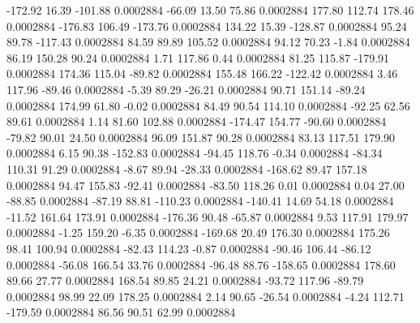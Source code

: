      -172.92       16.39     -101.88     0.0002884
      -66.09       13.50       75.86     0.0002884
      177.80      112.74      178.46     0.0002884
     -176.83      106.49     -173.76     0.0002884
      134.22       15.39     -128.87     0.0002884
       95.24       89.78     -117.43     0.0002884
       84.59       89.89      105.52     0.0002884
       94.12       70.23       -1.84     0.0002884
       86.19      150.28       90.24     0.0002884
        1.71      117.86        0.44     0.0002884
       81.25      115.87     -179.91     0.0002884
      174.36      115.04      -89.82     0.0002884
      155.48      166.22     -122.42     0.0002884
        3.46      117.96      -89.46     0.0002884
       -5.39       89.29      -26.21     0.0002884
       90.71      151.14      -89.24     0.0002884
      174.99       61.80       -0.02     0.0002884
       84.49       90.54      114.10     0.0002884
      -92.25       62.56       89.61     0.0002884
        1.14       81.60      102.88     0.0002884
     -174.47      154.77      -90.60     0.0002884
      -79.82       90.01       24.50     0.0002884
       96.09      151.87       90.28     0.0002884
       83.13      117.51      179.90     0.0002884
        6.15       90.38     -152.83     0.0002884
      -94.45      118.76       -0.34     0.0002884
      -84.34      110.31       91.29     0.0002884
       -8.67       89.94      -28.33     0.0002884
     -168.62       89.47      157.18     0.0002884
       94.47      155.83      -92.41     0.0002884
      -83.50      118.26        0.01     0.0002884
        0.04       27.00      -88.85     0.0002884
      -87.19       88.81     -110.23     0.0002884
     -140.41       14.69       54.18     0.0002884
      -11.52      161.64      173.91     0.0002884
     -176.36       90.48      -65.87     0.0002884
        9.53      117.91      179.97     0.0002884
       -1.25      159.20       -6.35     0.0002884
     -169.68       20.49      176.30     0.0002884
      175.26       98.41      100.94     0.0002884
      -82.43      114.23       -0.87     0.0002884
      -90.46      106.44      -86.12     0.0002884
      -56.08      166.54       33.76     0.0002884
      -96.48       88.76     -158.65     0.0002884
      178.60       89.66       27.77     0.0002884
      168.54       89.85       24.21     0.0002884
      -93.72      117.96      -89.79     0.0002884
       98.99       22.09      178.25     0.0002884
        2.14       90.65      -26.54     0.0002884
       -4.24      112.71     -179.59     0.0002884
       86.56       90.51       62.99     0.0002884
